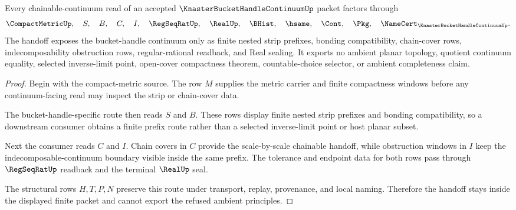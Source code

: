 \begin{theorem}
\label{thm:knaster-bucket-handle-continuum-chainable-handoff}
Every chainable-continuum read of an accepted $\KnasterBucketHandleContinuumUp$ packet factors through
$$
\CompactMetricUp,\quad S,\quad B,\quad C,\quad I,\quad \RegSeqRatUp,\quad \RealUp,\quad \BHist,\quad \hsame,\quad \Cont,\quad \Pkg,\quad \NameCert_{\KnasterBucketHandleContinuumUp}.
$$
The handoff exposes the bucket-handle continuum only as finite nested strip prefixes, bonding compatibility, chain-cover rows, indecomposability obstruction rows, regular-rational readback, and Real sealing. It exports no ambient planar topology, quotient continuum equality, selected inverse-limit point, open-cover compactness theorem, countable-choice selector, or ambient completeness claim.
\end{theorem}
\begin{proof}
Begin with the compact-metric source. The row $M$ supplies the metric carrier and finite compactness windows before any continuum-facing read may inspect the strip or chain-cover data.

The bucket-handle-specific route then reads $S$ and $B$. These rows display finite nested strip prefixes and bonding compatibility, so a downstream consumer obtains a finite prefix route rather than a selected inverse-limit point or host planar subset.

Next the consumer reads $C$ and $I$. Chain covers in $C$ provide the scale-by-scale chainable handoff, while obstruction windows in $I$ keep the indecomposable-continuum boundary visible inside the same prefix. The tolerance and endpoint data for both rows pass through $\RegSeqRatUp$ readback and the terminal $\RealUp$ seal.

The structural rows $H,T,P,N$ preserve this route under transport, replay, provenance, and local naming. Therefore the handoff stays inside the displayed finite packet and cannot export the refused ambient principles.
\end{proof}



